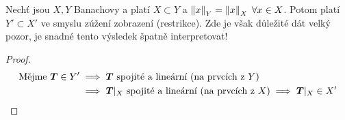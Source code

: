\begin{lemma}
    Nechť jsou $X,Y$ Banachovy a platí $X \subset Y$ a $\left\lVert x\right\rVert_Y = \left\lVert x\right\rVert_X \; \forall x \in X$. Potom platí $Y' \subset X'$ ve smyslu zúžení zobrazení (restrikce). Zde je však důležité dát velký pozor, je snadné tento výsledek špatně interpretovat!
\end{lemma}
\begin{proof}
    \begin{align*}
    \text{Mějme } \boldsymbol{T} \in Y'
    &\implies
    \boldsymbol{T} \text{ spojité a lineární (na prvcích z $Y$) }
    \\
    &\implies
    \boldsymbol{T}|_X \text{ spojité a lineární (na prvcích z $X$)}
    \implies
    \boldsymbol{T}|_X \in X'
    \end{align*}
\end{proof}

